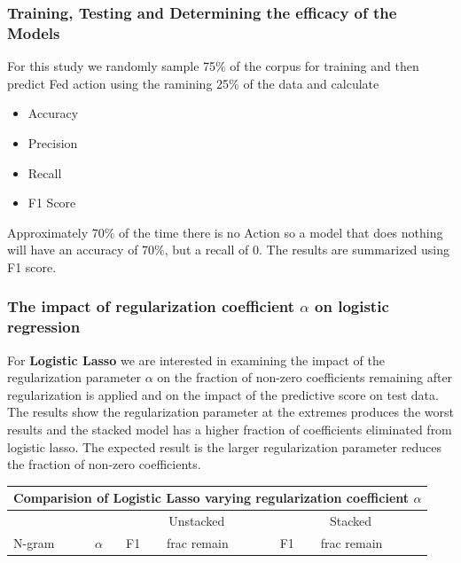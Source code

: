 \documentclass[11pt]{article}
\begin{document}
{\subsubsection{Training, Testing and Determining the efficacy of the Models}
For this study we randomly sample 75$\%$ of the corpus for training and then 
predict Fed action using the ramining 25$\%$ of the data and calculate
\begin{itemize}
\item Accuracy
\item Precision
\item Recall
\item F1 Score
\end{itemize}
Approximately 70$\%$ of the time there is no Action so a model that does nothing will
have an accuracy of 70$\%$, but a recall of 0.  The results are summarized using F1
score.

\subsubsection{The impact of regularization coefficient $\alpha$ on logistic regression}
\noindent 
For \textbf{Logistic Lasso} we are interested in examining the impact of the regularization parameter $\alpha$ on
the fraction of  non-zero coefficients remaining after regularization is applied and on the impact of the predictive
score on test data. The results show the regularization parameter at the extremes produces the worst results
and the stacked model has a higher fraction of coefficients eliminated from logistic lasso. The expected result
is the larger regularization parameter reduces the fraction of non-zero coefficients.\\

\noindent \begin{tabular}{ |p{2cm}||p{2cm}|p{2cm}|p{2cm}|p{2cm}|p{2cm}|  }
 \hline
 \multicolumn{6}{|c|}{Comparision of Logistic Lasso varying regularization coefficient $\alpha$} \\
 \hline
 \multicolumn{1}{|c|}{} &
 \multicolumn{1}{|c|}{} &
 \multicolumn{2}{|c|}{Unstacked} &
 \multicolumn{2}{|c|}{Stacked}\\
 \hline
 N-gram & $\alpha$ & F1 & frac remain & F1 & frac remain\\
 \hline


\end{tabular}}
\end{document}

